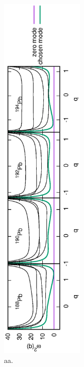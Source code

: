 \documentclass[%
superscriptaddress,
showpacs,
nofootinbib,
amsmath,amssymb,
aps,
prc,
twocolumn,
floatfix ]%
{revtex4-1}
\begin{document}
\begin{figure}[t]
 \begin{center}
  \includegraphics[width=40mm,angle=-90]{Pbomega_sq.eps}
 \end{center}
 \captionsetup{labelformat=empty,labelsep=none}
	\caption{aa.
}
 \label{fig:N8Pad}
\end{figure}
\end{document}
